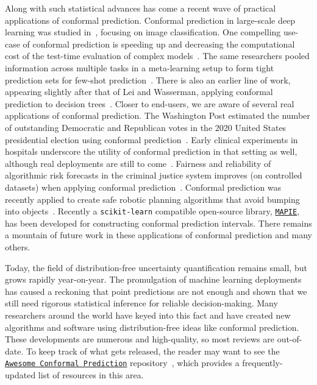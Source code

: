 \documentclass[10pt]{article}
\begin{document}
Along with such statistical advances has come a recent wave of practical applications of conformal prediction.
Conformal prediction in large-scale deep learning was studied in~\cite{angelopoulos2020sets}, focusing on image classification.
One compelling use-case of conformal prediction is speeding up and decreasing the computational cost of the test-time evaluation of complex models~\citep{fisch2020efficient,schuster2021consistent}.
The same researchers pooled information across multiple tasks in a meta-learning setup to form tight prediction sets for few-shot prediction~\citep{fisch2021few}.
There is also an earlier line of work, appearing slightly after that of Lei and Wasserman, applying conformal prediction to decision trees~\cite{johansson2014regression, linusson2017calibration, bostrom2017accelerating}.
Closer to end-users, we are aware of several real applications of conformal prediction.
The Washington Post estimated the number of outstanding Democratic and Republican votes in the 2020 United States presidential election using conformal prediction~\cite{cherian2020washington}.
Early clinical experiments in hospitals underscore the utility of conformal prediction in that setting as well, although real deployments are still to come~\cite{lu2021distribution,lu2021fair}.
Fairness and reliability of algorithmic risk forecasts in the criminal justice system improves (on controlled datasets) when applying conformal prediction~\cite{Romano2020With, kuchibhotla2021nested,lu2021fair}.
Conformal prediction was recently applied to create safe robotic planning algorithms that avoid bumping into objects~\cite{lindemann2022safe,dixit2022adaptive}.
Recently a \texttt{scikit-learn} compatible open-source library, \href{https://github.com/scikit-learn-contrib/MAPIE}{\texttt{MAPIE}}, has been developed for constructing conformal prediction intervals.
There remains a mountain of future work in these applications of conformal prediction and many others.

Today, the field of distribution-free uncertainty quantification remains small, but grows rapidly year-on-year.
The promulgation of machine learning deployments has caused a reckoning that point predictions are not enough and shown that we still need rigorous statistical inference for reliable decision-making.
Many researchers around the world have keyed into this fact and have created new algorithms and software using distribution-free ideas like conformal prediction.
These developments are numerous and high-quality, so most reviews are out-of-date. 
To keep track of what gets released, the reader may want to see the \href{https://github.com/valeman/awesome-conformal-prediction}{\texttt{Awesome Conformal Prediction}} repository~\cite{acp}, which provides a frequently-updated list of resources in this area.
\end{document}
